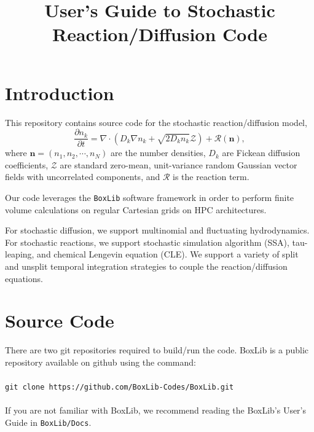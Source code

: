 \documentclass[final]{siamltex}
\newcommand{\nb}{\mathbf{n}}
\def\mRb {\bm{\mathcal{R}}}
\def\mZb {\bm{\mathcal{Z}}}
\begin{document}
\title{User's Guide to Stochastic Reaction/Diffusion Code}

\maketitle

\section{Introduction}
This repository contains source code for the stochastic reaction/diffusion model,
\begin{equation}
\frac{\partial n_k}{\partial t} = \nabla\cdot\left(D_k\nabla n_k + \sqrt{2D_kn_k}\mZb\right) + \mRb(\nb),
\end{equation}
where $\nb=(n_1,n_2,\cdots,n_N)$ are the number densities, $D_k$ are Fickean diffusion
coefficients, $\mZb$ are standard zero-mean, unit-variance random Gaussian 
vector fields with uncorrelated components, and $\mRb$ is the reaction term.

Our code leverages the {\tt BoxLib} software framework in order to perform
finite volume calculations on regular Cartesian grids on HPC architectures.

For stochastic diffusion, we support multinomial and fluctuating hydrodynamics.
For stochastic reactions, we support stochastic simulation algorithm (SSA),
tau-leaping, and chemical Lengevin equation (CLE).  We support a variety of
split and unsplit temporal integration strategies to couple the reaction/diffusion
equations.

\section{Source Code}
There are two git repositories required to build/run the code.  BoxLib is a public
repository available on github using the command:\\ \\
{\tt git clone https://github.com/BoxLib-Codes/BoxLib.git}\\ \\
If you are not familiar with BoxLib, we recommend reading the BoxLib's User's Guide
in {\tt BoxLib/Docs}.\\
\end{document}
